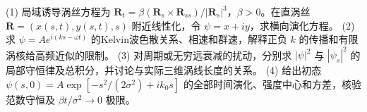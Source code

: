 (1) 局域诱导涡丝方程为 \(\mathbf R_t=\beta(\mathbf R_s\times\mathbf R_{ss})/|\mathbf R_s|^3\)，\(\beta>0\)。在直涡丝 \(\mathbf R=(x(s,t),y(s,t),s)\) 附近线性化，令 \(\psi=x+iy\)，求横向演化方程。
(2) 求 \(\psi=Ae^{i(ks-\omega t)}\) 的Kelvin波色散关系、相速和群速，解释正负 \(k\) 的传播和有限涡核给高频近似的限制。
(3) 对周期或无穷远衰减的扰动，分别求 \(|\psi|^2\) 与 \(|\psi_s|^2\) 的局部守恒律及总积分，并讨论与实际三维涡线长度的关系。
(4) 给出初态 \(\psi(s,0)=A\exp[-s^2/(2\sigma^2)+ik_0s]\) 的全部时间演化、强度中心和方差，核验范数守恒及 \(\beta t/\sigma^2\to0\) 极限。
